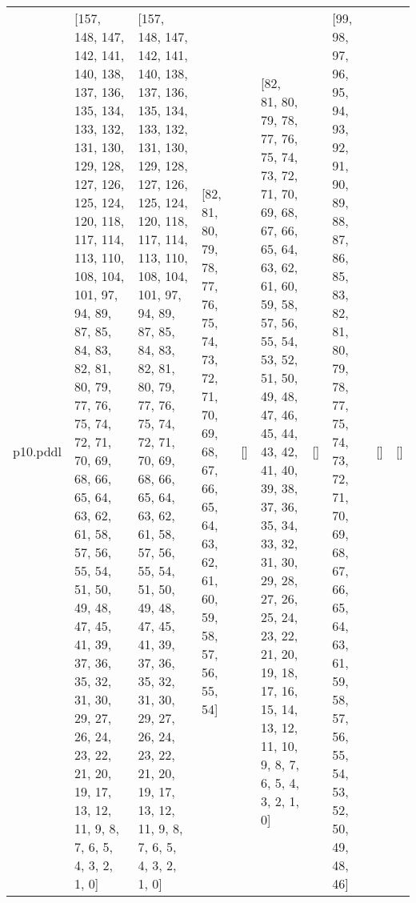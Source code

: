 \documentclass{article}
\begin{document}
\begin{tabular}{@{}lrrrrrrrrr@{}}
p10.pddl & \multicolumn{1}{|l|}{[157, 148, 147, 142, 141, 140, 138, 137, 136, 135, 134, 133, 132, 131, 130, 129, 128, 127, 126, 125, 124, 120, 118, 117, 114, 113, 110, 108, 104, 101, 97, 94, 89, 87, 85, 84, 83, 82, 81, 80, 79, 77, 76, 75, 74, 72, 71, 70, 69, 68, 66, 65, 64, 63, 62, 61, 58, 57, 56, 55, 54, 51, 50, 49, 48, 47, 45, 41, 39, 37, 36, 35, 32, 31, 30, 29, 27, 26, 24, 23, 22, 21, 20, 19, 17, 13, 12, 11, 9, 8, 7, 6, 5, 4, 3, 2, 1, 0]} & \multicolumn{1}{|l|}{[157, 148, 147, 142, 141, 140, 138, 137, 136, 135, 134, 133, 132, 131, 130, 129, 128, 127, 126, 125, 124, 120, 118, 117, 114, 113, 110, 108, 104, 101, 97, 94, 89, 87, 85, 84, 83, 82, 81, 80, 79, 77, 76, 75, 74, 72, 71, 70, 69, 68, 66, 65, 64, 63, 62, 61, 58, 57, 56, 55, 54, 51, 50, 49, 48, 47, 45, 41, 39, 37, 36, 35, 32, 31, 30, 29, 27, 26, 24, 23, 22, 21, 20, 19, 17, 13, 12, 11, 9, 8, 7, 6, 5, 4, 3, 2, 1, 0]} & \multicolumn{1}{|l|}{[82, 81, 80, 79, 78, 77, 76, 75, 74, 73, 72, 71, 70, 69, 68, 67, 66, 65, 64, 63, 62, 61, 60, 59, 58, 57, 56, 55, 54]} & \multicolumn{1}{|l|}{[]} & \multicolumn{1}{|l|}{[82, 81, 80, 79, 78, 77, 76, 75, 74, 73, 72, 71, 70, 69, 68, 67, 66, 65, 64, 63, 62, 61, 60, 59, 58, 57, 56, 55, 54, 53, 52, 51, 50, 49, 48, 47, 46, 45, 44, 43, 42, 41, 40, 39, 38, 37, 36, 35, 34, 33, 32, 31, 30, 29, 28, 27, 26, 25, 24, 23, 22, 21, 20, 19, 18, 17, 16, 15, 14, 13, 12, 11, 10, 9, 8, 7, 6, 5, 4, 3, 2, 1, 0]} & \multicolumn{1}{|l|}{[]} & \multicolumn{1}{|l|}{[99, 98, 97, 96, 95, 94, 93, 92, 91, 90, 89, 88, 87, 86, 85, 83, 82, 81, 80, 79, 78, 77, 75, 74, 73, 72, 71, 70, 69, 68, 67, 66, 65, 64, 63, 61, 59, 58, 57, 56, 55, 54, 53, 52, 50, 49, 48, 46]} & \multicolumn{1}{|l|}{[]} & \multicolumn{1}{|l|}{[]} \\

\end{tabular}
\end{document}
